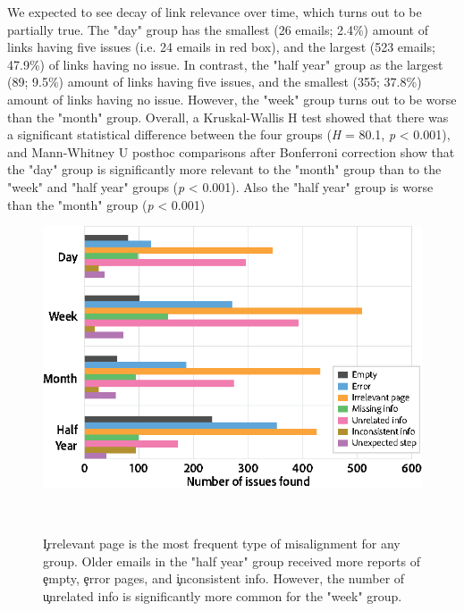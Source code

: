 \documentclass{sigchi}
\begin{document}
We expected to see decay of link relevance over time, which turns out to be partially true. The "day" group has the smallest (26 emails; 2.4\%) amount of links having five issues (i.e. 24 emails in red box), and the largest (523 emails; 47.9\%) of links having no issue. In contrast, the "half year" group as the largest (89; 9.5\%) amount of links having five issues, and the smallest (355; 37.8\%) amount of links having no issue. However, the "week" group turns out to be worse than the "month" group. Overall, a Kruskal-Wallis H test showed that there was a significant statistical difference between the four groups (\textit{H} = 80.1, \textit{p} < 0.001), and Mann-Whitney U posthoc comparisons after Bonferroni correction show that the "day" group is significantly more relevant to the "month" group than to the "week" and "half year" groups (\textit{p} < 0.001). Also the "half year" group is worse than the "month" group (\textit{p} < 0.001)    


\begin{figure}[tbp]
  \centering
  \includegraphics[width=1.0\columnwidth]{figures/issues_group}
  \caption{\c{Irrelevant page} is the most frequent type of misalignment for any group. Older emails in the "half year" group received more reports of \c{empty}, \c{error} pages, and \c{inconsistent info}. However, the number of \c{unrelated info} is significantly more common for the "week" group.}~\label{fig:issues_group}
\end{figure}
\end{document}
